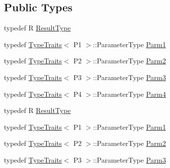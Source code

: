 \subsection*{Public Types}
\begin{DoxyCompactItemize}
\item 
typedef R \mbox{\hyperlink{classUtil_1_1FunctorImpl_3_01R_00_01TYPELIST__4_07P1_00_01P2_00_01P3_00_01P4_08_4_a9218a4b4370d688d3e144a75e5d24cfe}{Result\+Type}}
\item 
typedef \mbox{\hyperlink{classUtil_1_1TypeTraits}{Type\+Traits}}$<$ P1 $>$\+::Parameter\+Type \mbox{\hyperlink{classUtil_1_1FunctorImpl_3_01R_00_01TYPELIST__4_07P1_00_01P2_00_01P3_00_01P4_08_4_ab22bf7d6b59a883bb4a582f3a8ceaccc}{Parm1}}
\item 
typedef \mbox{\hyperlink{classUtil_1_1TypeTraits}{Type\+Traits}}$<$ P2 $>$\+::Parameter\+Type \mbox{\hyperlink{classUtil_1_1FunctorImpl_3_01R_00_01TYPELIST__4_07P1_00_01P2_00_01P3_00_01P4_08_4_aaf289567dfbd9f3379db79d06f02f4a7}{Parm2}}
\item 
typedef \mbox{\hyperlink{classUtil_1_1TypeTraits}{Type\+Traits}}$<$ P3 $>$\+::Parameter\+Type \mbox{\hyperlink{classUtil_1_1FunctorImpl_3_01R_00_01TYPELIST__4_07P1_00_01P2_00_01P3_00_01P4_08_4_a50b605c92c54da7770a000867a97287a}{Parm3}}
\item 
typedef \mbox{\hyperlink{classUtil_1_1TypeTraits}{Type\+Traits}}$<$ P4 $>$\+::Parameter\+Type \mbox{\hyperlink{classUtil_1_1FunctorImpl_3_01R_00_01TYPELIST__4_07P1_00_01P2_00_01P3_00_01P4_08_4_a7375a2710126cb146191bd1c17af2f1d}{Parm4}}
\item 
typedef R \mbox{\hyperlink{classUtil_1_1FunctorImpl_3_01R_00_01TYPELIST__4_07P1_00_01P2_00_01P3_00_01P4_08_4_a9218a4b4370d688d3e144a75e5d24cfe}{Result\+Type}}
\item 
typedef \mbox{\hyperlink{classUtil_1_1TypeTraits}{Type\+Traits}}$<$ P1 $>$\+::Parameter\+Type \mbox{\hyperlink{classUtil_1_1FunctorImpl_3_01R_00_01TYPELIST__4_07P1_00_01P2_00_01P3_00_01P4_08_4_ab22bf7d6b59a883bb4a582f3a8ceaccc}{Parm1}}
\item 
typedef \mbox{\hyperlink{classUtil_1_1TypeTraits}{Type\+Traits}}$<$ P2 $>$\+::Parameter\+Type \mbox{\hyperlink{classUtil_1_1FunctorImpl_3_01R_00_01TYPELIST__4_07P1_00_01P2_00_01P3_00_01P4_08_4_aaf289567dfbd9f3379db79d06f02f4a7}{Parm2}}
\item 
typedef \mbox{\hyperlink{classUtil_1_1TypeTraits}{Type\+Traits}}$<$ P3 $>$\+::Parameter\+Type \mbox{\hyperlink{classUtil_1_1FunctorImpl_3_01R_00_01TYPELIST__4_07P1_00_01P2_00_01P3_00_01P4_08_4_a50b605c92c54da7770a000867a97287a}{Parm3}}

\end{DoxyCompactItemize}
